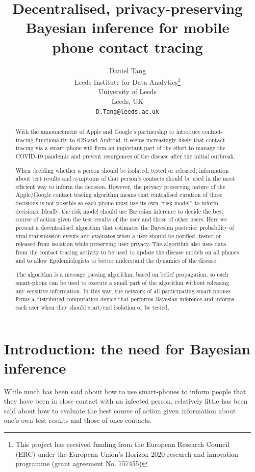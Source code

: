 \documentclass{article}
\title{Decentralised, privacy-preserving Bayesian inference for mobile phone contact tracing}
\author{
  Daniel Tang\\
  Leeds Institute for Data Analytics\thanks{This project has received funding from the European Research Council (ERC) under the European Union’s Horizon 2020 research and innovation programme (grant agreement No. 757455)}\\
  University of Leeds\\
  Leeds, UK\\
  \texttt{D.Tang@leeds.ac.uk} \\
}
\begin{document}
\maketitle

\begin{abstract}
With the announcement of Apple and Google's partnership to introduce contact-tracing functionality to iOS and Android, it seems increasingly likely that contact tracing via a smart-phone will form an important part of the effort to manage the COVID-19 pandemic and prevent resurgences of the disease after the initial outbreak.

When deciding whether a person should be isolated, tested or released, information about test results and symptoms of that person's contacts should be used in the most efficient way to inform the decision. However, the privacy preserving nature of the Apple/Google contact tracing algorithm means that centralised curation of these decisions is not possible so each phone must use its own ``risk model'' to inform decisions. Ideally, the risk model should use Bayesian inference to decide the best course of action given the test results of the user and those of other users. Here we present a decentralised algorithm that estimates the Bayesian posterior probability of viral transmission events and evaluates when a user should be notified, tested or released from isolation while preserving user privacy. The algorithm also uses data from the contact tracing activity to be used to update the disease models on all phones and to allow Epidemiologists to better understand the dynamics of the disease.

The algorithm is a message passing algorithm, based on belief propagation, so each smart-phone can be used to execute a small part of the algorithm without releasing any sensitive information. In this way, the network of all participating smart-phones forms a distributed computation device that performs Bayesian inference and informs each user when they should start/end isolation or be tested.
\end{abstract}


\section{Introduction: the need for Bayesian inference}

While much has been said about how to use smart-phones to inform people that they have been in close contact with an infected person\cite{dp3t}\cite{applegoogle}\cite{pepppt}, relatively little has been said about how to evaluate the best course of action given information about one's own test results and those of ones contacts.
\end{document}
